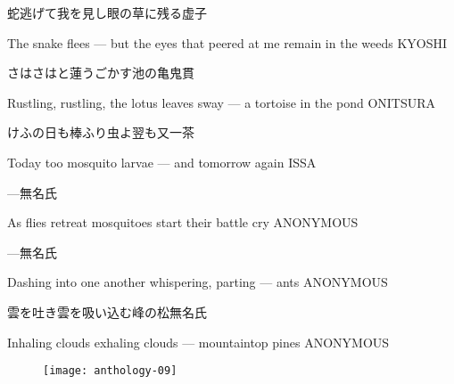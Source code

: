 \begin{haiku}
    {\FH 蛇逃げて我を見し眼の草に残る}\hfill{\FH 虚子}

    \vin{} The snake flees ---
    \vin{} \vin{} but the eyes that peered at me
    \vin{} \vin{} \vin{} remain in the weeds \hspace{\fill} KYOSHI
\end{haiku}

\begin{haiku}
    {\FH さはさはと蓮うごかす池の亀}\hfill{\FH 鬼貫}

    \vin{} Rustling, rustling,
    \vin{} \vin{} the lotus leaves sway ---
    \vin{} \vin{} \vin{} a tortoise in the pond \hspace{\fill} ONITSURA
\end{haiku}

\begin{haiku}
    {\FH けふの日も棒ふり虫よ翌も又}\hfill{\FH 一茶}

    \vin{} Today too
    \vin{} \vin{} mosquito larvae ---
    \vin{} \vin{} \vin{} and tomorrow again \hspace{\fill} ISSA
\end{haiku}

\begin{haiku}
    {---}\hfill{\FH 無名氏}

    \vin{} As flies retreat
    \vin{} \vin{} mosquitoes start
    \vin{} \vin{} \vin{} their battle cry \hspace{\fill} ANONYMOUS
\end{haiku}

\begin{haiku}
    {---}\hfill{\FH 無名氏}

    \vin{} Dashing into one another
    \vin{} \vin{} whispering, parting ---
    \vin{} \vin{} \vin{} ants \hspace{\fill} ANONYMOUS
\end{haiku}

\begin{haiku}
    {雲を吐き雲を吸い込む峰の松}\hfill{\FH 無名氏}

    \vin{} Inhaling clouds
    \vin{} \vin{} exhaling clouds ---
    \vin{} \vin{} \vin{} mountaintop pines \hspace{\fill} ANONYMOUS
\end{haiku}

\begin{figure}
    \texttt{[image: anthology-09]}
\end{figure}


